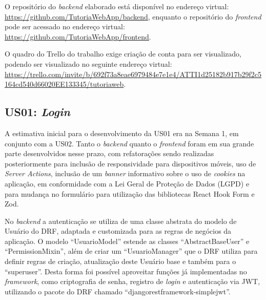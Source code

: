 
O repositório do \textit{backend} elaborado está disponível no endereço virtual: \url{https://github.com/TutoriaWebApp/backend}, enquanto o repositório do \textit{frontend} pode ser acessado no endereço virtual: \url{https://github.com/TutoriaWebApp/frontend}.

O quadro do Trello do trabalho exige criação de conta para ser visualizado, podendo ser visualizado no seguinte endereço virtual:  \url{https://trello.com/invite/b/692f73a8eae6979484e7e1e4/ATTI1d25182b917b29f2c5164cd540d66020EE133345/tutoriaweb}.



\subsection[US01: \textit{Login}]{US01: \textit{Login}}
\label{sec:us01}

A estimativa inicial para o desenvolvimento da US01 era na Semana 1, em conjunto com a US02. Tanto o \textit{backend} quanto o \textit{frontend} foram em sua grande parte desenvolvidos nesse prazo, com refatorações sendo realizadas posteriormente para inclusão de responsividade para dispositivos móveis, uso de \textit{Server Actions}, inclusão de um \textit{banner} informativo sobre o uso de \textit{cookies} na aplicação, em conformidade com a Lei Geral de Proteção de Dados (LGPD) e para mudança no formulário para utilização das bibliotecas React Hook Form e Zod.

No \textit{backend} a autenticação se utiliza de uma classe abstrata do modelo de Usuário do DRF, adaptada e customizada para as regras de negócios da aplicação. O modelo ``UsuarioModel'' estende as classes ``AbstractBaseUser'' e ``PermissionMixin'', além de criar um ``UsuarioManager'' que o DRF utiliza para definir regras de criação, atualização deste Usuário base e também para o ``superuser''. Desta forma foi possível aproveitar funções já implementadas no \textit{framework}, como criptografia de senha, registro de \textit{login} e autenticação via JWT, utilizando o pacote do DRF chamado ``djangorestframework-simplejwt''.

